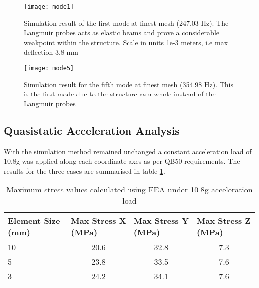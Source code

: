 \begin{figure}[H]
\centering	
\texttt{[image: mode1]}
\caption{Simulation result of the first mode at finest mesh (247.03 Hz). The Langmuir probes acts as elastic beams and prove a considerable weakpoint within the structure. Scale in units 1e-3 meters, i.e max deflection 3.8 mm}
\label{fig:mode1}
\end{figure}

\begin{figure}[H]
\centering	
\texttt{[image: mode5]}
\caption{Simulation result for the fifth mode at finest mesh (354.98 Hz). This is the first mode due to the structure as a whole instead of the Langmuir probes}
\label{fig:mode5}
\end{figure}


\subsection{Quasistatic Acceleration Analysis}

With the simulation method remained unchanged a constant acceleration load of 10.8g was applied along each coordinate axes as per QB50 requirements. The results for the three cases are summarised in table \ref{table:stresses}. \\ 

\begin{table}[]
\centering
\begin{tabular}{@{}lccc@{}}
\toprule
\textbf{Element Size (mm)} & \multicolumn{1}{l}{\textbf{Max Stress X (MPa)}} & \multicolumn{1}{l}{\textbf{Max Stress Y (MPa)}} & \multicolumn{1}{l}{\textbf{Max Stress Z (MPa)}} \\ \midrule
10                         & 20.6                                            & 32.8                                            & 7.3                                             \\
5                          & 23.8                                            & 33.5                                            & 7.6                                             \\
3                          & 24.2                                           & 34.1                                             & 7.6                                             \\ \bottomrule
\end{tabular}
\caption{Maximum stress values calculated using FEA under 10.8g acceleration load}
\label{table:stresses}
\end{table}

